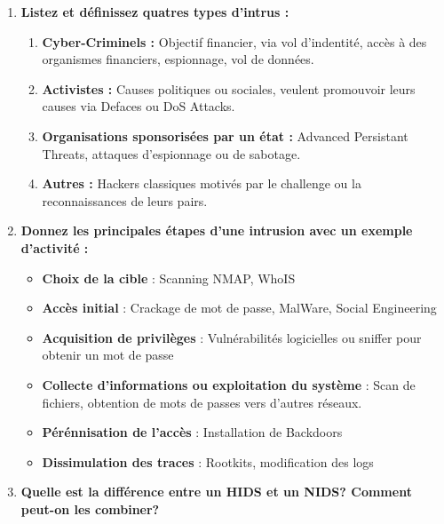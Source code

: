 \documentclass{report}
\begin{document}
			\begin{enumerate}
				\item \textbf{Listez et définissez quatres types d'intrus : }\\

					\begin{enumerate}
						\item \textbf{Cyber-Criminels : } Objectif financier, via vol d'indentité, accès à des organismes financiers, espionnage, vol de données.\\
						\item \textbf{Activistes : } Causes politiques ou sociales, veulent promouvoir leurs causes via Defaces ou DoS Attacks.\\
						\item \textbf{Organisations sponsorisées par un état : } Advanced Persistant Threats, attaques d'espionnage ou de sabotage.\\
						\item \textbf{Autres : } Hackers classiques motivés par le challenge ou la reconnaissances de leurs pairs.\\
					\end{enumerate}

				\item \textbf{Donnez les principales étapes d'une intrusion avec un exemple d'activité : }\\

					\begin{itemize}
						\item \textbf{Choix de la cible} : Scanning NMAP, WhoIS
						\item \textbf{Accès initial} : Crackage de mot de passe, MalWare, Social Engineering
						\item \textbf{Acquisition de privilèges} : Vulnérabilités logicielles ou sniffer pour obtenir un mot de passe
						\item \textbf{Collecte d'informations ou exploitation du système} : Scan de fichiers, obtention de mots de passes vers d'autres réseaux.
						\item \textbf{Pérénnisation de l'accès} : Installation de Backdoors
						\item \textbf{Dissimulation des traces} : Rootkits, modification des logs
					\end{itemize}

				\item \textbf{Quelle est la différence entre un HIDS et un NIDS? Comment peut-on les combiner? }\\


\end{enumerate}
\end{document}
